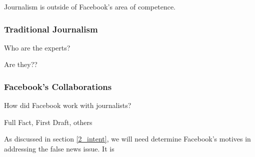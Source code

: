 
\par Journalism is outside of Facebook's area of competence.

%
\subsubsection{Traditional Journalism}

\par Who are the experts?


\par Are they??

%
\subsubsection{Facebook's Collaborations}

\par How did Facebook work with journalists?


\par Full Fact, First Draft, others

\label{7_intent}

\par As discussed in section \ref{2_intent}, we will need determine Facebook's motives in addressing the false news issue. It is
\cite{kant}